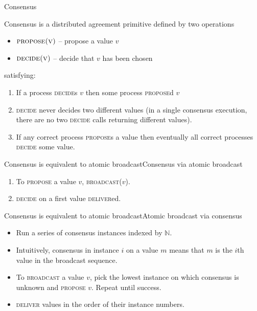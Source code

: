 \documentclass{beamer}
\begin{document}
\begin{frame}{Consensus}
  \begin{definition}
    Consensus is a distributed agreement primitive defined by two operations
    \begin{itemize}
      \item $\textsc{propose(v)}$ -- propose a value $v$
      \item $\textsc{decide(v)}$ -- decide that $v$ has been chosen
    \end{itemize}
    satisfying:
    \begin{enumerate}
      \item If a process \textsc{decide}s $v$ then some process \textsc{propose}d $v$
      \item \textsc{decide} \alert{never} decides two different values (in a single consensus execution, there are no two \textsc{decide} calls returning different values).
      \item If any correct process \textsc{propose}s a value then eventually all correct processes \textsc{decide} some value.
    \end{enumerate}
  \end{definition}
\end{frame}

\begin{frame}{Consensus is equivalent to atomic broadcast}{Consensus via atomic broadcast}
  \begin{enumerate}
    \item To \textsc{propose} a value $v$, \textsc{broadcast}($v$).
    \item \textsc{decide} on a first value \textsc{deliver}ed.
  \end{enumerate}
\end{frame}

\begin{frame}{Consensus is equivalent to atomic broadcast}{Atomic broadcast via consensus}
  \begin{itemize}
    \item Run a series of consensus instances indexed by $\mathbb{N}$.
    \item Intuitively, consensus in instance $i$ on a value $m$ means that $m$ is the $i$th value in the broadcast sequence.
    \item To \textsc{broadcast} a value $v$, pick the lowest instance on which consensus is unknown and \textsc{propose} $v$. Repeat until success.
    \item \textsc{deliver} values in the order of their instance numbers.
  \end{itemize}
\end{frame}
\end{document}
